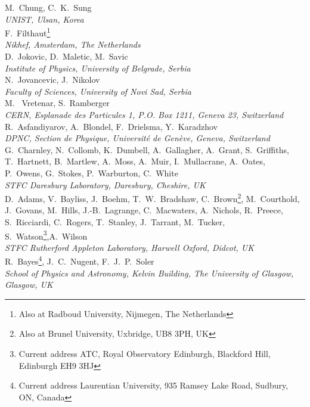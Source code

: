 M.~Chung, C.~K.~Sung
\\{\it 
UNIST, Ulsan, Korea
}\\

F.~Filthaut\footnote{Also at Radboud University, Nijmegen, The Netherlands}
\\{\it
Nikhef, Amsterdam, The Netherlands
}\\

D.~Jokovic, D.~Maletic, M.~Savic
\\{\it
Institute of Physics, University of Belgrade, Serbia
}\\

N.~Jovancevic, J.~Nikolov
\\{\it
Faculty of Sciences,  University of Novi Sad,  Serbia
}\\

M. ~Vretenar, S.~Ramberger
\\{\it
  CERN, Esplanade des Particules 1, P.O. Box 1211, Geneva 23, Switzerland
}\\

R.~Asfandiyarov, A.~Blondel, F.~Drielsma, Y.~Karadzhov 
\\{\it
DPNC, Section de Physique, Universit\'e de Gen\`eve, Geneva, Switzerland
}\\

G.~Charnley, N.~Collomb,  K.~Dumbell, A.~Gallagher, A.~Grant, S.~Griffiths,  T.~Hartnett, B.~Martlew, 
A.~Moss, A.~Muir, I.~Mullacrane, A.~Oates, P.~Owens, G.~Stokes, P.~Warburton, C.~White
\\{\it
STFC Daresbury Laboratory, Daresbury, Cheshire, UK
}\\

D.~Adams,   V.~Bayliss, J.~Boehm, T.~W.~Bradshaw, C.~Brown\footnote{Also at Brunel University, Uxbridge, UB8 3PH, UK}, M.~Courthold,  J.~Govans, M.~Hills, J.-B.~Lagrange, C.~Macwaters, A.~Nichols, R.~Preece, S.~Ricciardi, C.~Rogers, T.~Stanley, J.~Tarrant,  
M.~Tucker, S.~Watson\footnote{Current address ATC, Royal Observatory Edinburgh, Blackford Hill,  Edinburgh EH9 3HJ},A.~Wilson
\\{\it
 STFC Rutherford Appleton Laboratory, Harwell Oxford, Didcot, UK
}\\

R.~Bayes\footnote{Current address Laurentian University, 935 Ramsey Lake Road, Sudbury, ON, Canada},  J.~C.~Nugent, F.~J.~P.~Soler
\\{\it
School of Physics and Astronomy, Kelvin Building, The University of Glasgow, Glasgow, UK
}\\


